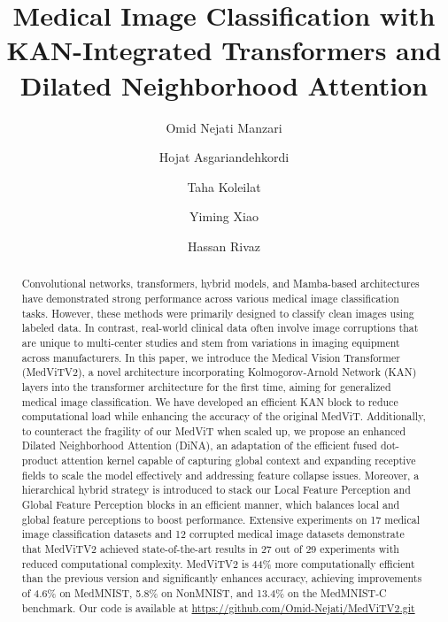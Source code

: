 \documentclass[times,twocolumn,final]{elsarticle}
\begin{document}
\begin{frontmatter}

\title{Medical Image Classification with KAN-Integrated Transformers and Dilated Neighborhood Attention}%


\author[1]{Omid Nejati Manzari} 
\author[2]{Hojat Asgariandehkordi}
\author[2]{Taha Koleilat}
\author[3]{Yiming Xiao}
\author[2]{Hassan Rivaz}



\address[1]{Independent Researcher, Tehran, Iran}
\address[2]{Department of Electrical and Computer Engineering, Concordia University, Montreal, Canada}
\address[3]{Department of Computer Science and Software Engineering, Concordia University, Montreal, Canada}




\begin{abstract} Convolutional networks, transformers, hybrid models, and Mamba-based architectures have demonstrated strong performance across various medical image classification tasks. However, these methods were primarily designed to classify clean images using labeled data. In contrast,  real-world clinical data often involve image corruptions that are unique to multi-center studies and stem from variations in imaging equipment across manufacturers.
In this paper, we introduce the Medical Vision Transformer (MedViTV2), a novel architecture incorporating Kolmogorov-Arnold Network (KAN) layers into the transformer architecture for the first time, aiming for generalized medical image classification. We have developed an efficient KAN block to reduce computational load while enhancing the accuracy of the original MedViT. Additionally, to counteract the fragility of our MedViT when scaled up, we propose an enhanced Dilated Neighborhood Attention (DiNA), an adaptation of the efficient fused dot-product attention kernel capable of capturing global context and expanding receptive fields to scale the model effectively and addressing feature collapse issues. Moreover, a hierarchical hybrid strategy is introduced to stack our Local Feature Perception and Global Feature Perception blocks in an efficient manner, which balances local and global feature perceptions to boost performance. Extensive experiments on 17 medical image classification datasets and 12 corrupted medical image datasets demonstrate that MedViTV2 achieved state-of-the-art results in 27 out of 29 experiments with reduced computational complexity. MedViTV2 is 44\% more computationally efficient than the previous version and significantly enhances accuracy, achieving improvements of 4.6\% on MedMNIST, 5.8\% on NonMNIST, and 13.4\% on the MedMNIST-C benchmark. Our code is available at \url{https://github.com/Omid-Nejati/MedViTV2.git}


\end{abstract}
\end{frontmatter}
\end{document}
